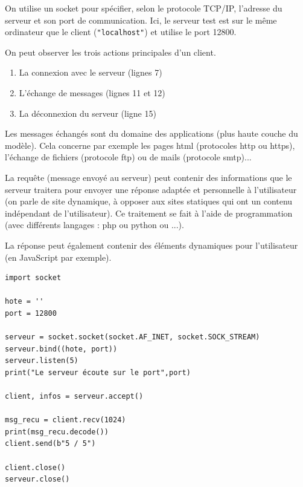 \vspace{-3ex}
On utilise un socket pour spécifier, selon le protocole TCP/IP, l'adresse du serveur et son port de communication. Ici, le serveur test est sur le même ordinateur que le client (\texttt{"localhost"}) et utilise le port 12800.

On peut observer les trois actions principales d'un client.

\begin{enumerate}
	\item La connexion avec le serveur (lignes 7)
	\item L'échange de messages (lignes 11 et 12)
	\item La déconnexion du serveur (ligne 15)
\end{enumerate}

Les messages échangés sont du domaine des applications (plus haute couche du modèle). Cela concerne par exemple les pages html (protocoles http ou https), l'échange de fichiers (protocole ftp) ou de mails (protocole smtp)...

\medskip

La requête (message envoyé au serveur) peut contenir des informations que le serveur traitera pour envoyer une réponse adaptée et personnelle à l'utilisateur (on parle de site dynamique, à opposer aux sites statiques qui ont un contenu indépendant de l'utilisateur). Ce traitement se fait à l'aide de programmation (avec différents langages : php ou python ou ...).

La réponse peut également contenir des éléments dynamiques pour l'utilisateur (en JavaScript par exemple).

\begin{verbatim}
import socket

hote = ''
port = 12800

serveur = socket.socket(socket.AF_INET, socket.SOCK_STREAM)
serveur.bind((hote, port))
serveur.listen(5)
print("Le serveur écoute sur le port",port)

client, infos = serveur.accept()

msg_recu = client.recv(1024)
print(msg_recu.decode())
client.send(b"5 / 5")

client.close()
serveur.close()
\end{verbatim}

